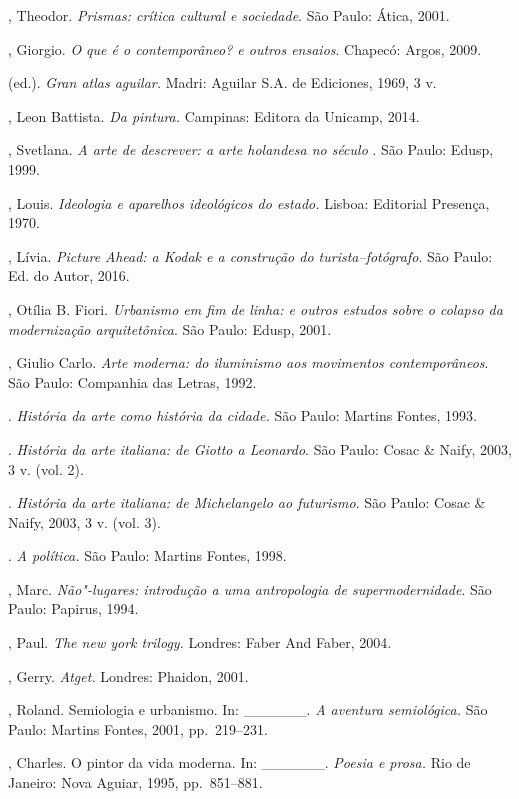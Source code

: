 \begin{bibliohedra}
, Theodor. \emph{Prismas: crítica cultural e sociedade}. São Paulo: Ática, 2001.

, Giorgio. \emph{O que é o contemporâneo? e outros ensaios}.
Chapecó: Argos, 2009.

 (ed.). \emph{Gran atlas aguilar.} Madri: Aguilar S.A. de
Ediciones, 1969, 3 v.

, Leon Battista. \emph{Da pintura.} Campinas: Editora da
Unicamp, 2014.

, Svetlana. \emph{A arte de descrever: a arte holandesa no
século} . São Paulo: Edusp, 1999.

, Louis. \emph{Ideologia e aparelhos ideológicos do estado.}
Lisboa: Editorial Presença, 1970.

, Lívia. \emph{Picture Ahead: a Kodak e a construção do
turista–fotógrafo}. São Paulo: Ed. do Autor, 2016.

, Otília B. Fiori. \emph{Urbanismo em fim de linha: e outros
estudos sobre o colapso da modernização arquitetônica}. São Paulo: Edusp,
2001.

, Giulio Carlo. \emph{Arte moderna: do iluminismo aos movimentos
contemporâneos}. São Paulo: Companhia das Letras, 1992.

\tit{\_\_\_\_\_\_}. \emph{História da arte como história da cidade.} São
Paulo: Martins Fontes, 1993.

\tit{\_\_\_\_\_\_}. \emph{História da arte italiana: de Giotto a
Leonardo}. São Paulo: Cosac \& Naify, 2003, 3 v. (vol. 2).

\tit{\_\_\_\_\_\_}. \emph{História da arte italiana: de Michelangelo ao
futurismo}. São Paulo: Cosac \& Naify, 2003, 3 v. (vol. 3).

. \emph{A política.} São Paulo: Martins Fontes, 1998.

, Marc. \emph{Não"-lugares: introdução a uma antropologia de
supermodernidade}. São Paulo: Papirus, 1994.

, Paul. \emph{The new york trilogy.} Londres: Faber And Faber,
2004.

, Gerry. \emph{Atget.} Londres: Phaidon, 2001.

, Roland. Semiologia e urbanismo. In: \_\_\_\_\_\_. \emph{A
aventura semiológica.} São Paulo: Martins Fontes, 2001, pp.~219--231.

, Charles. O pintor da vida moderna. In: \_\_\_\_\_\_.
\emph{Poesia e prosa.} Rio de Janeiro: Nova Aguiar, 1995, pp.~851--881.


\end{bibliohedra}
